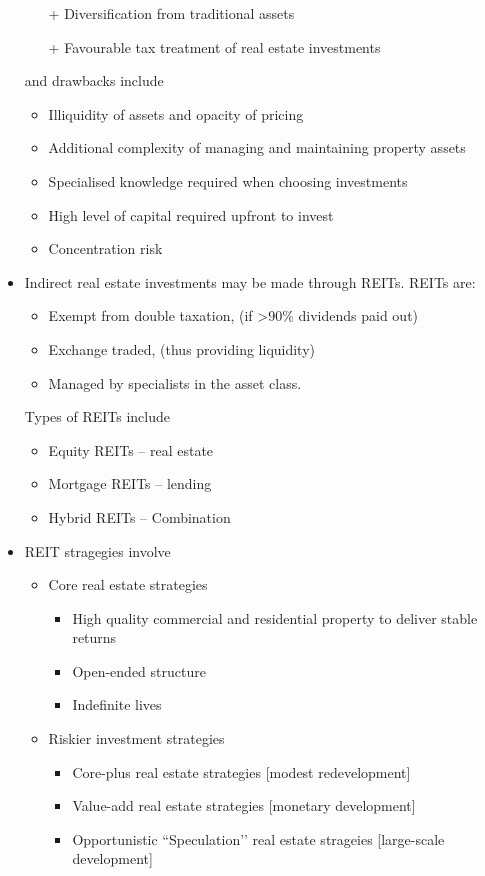 \documentclass[../notes_compiled.tex]{subfiles}
\begin{document}
\begin{itemize}
\begin{itemize}
\item[+] Diversification from traditional assets
\item[+] Favourable tax treatment of real estate investments
\end{itemize}
and drawbacks include
\begin{itemize}
\item Illiquidity of assets and opacity of pricing
\item Additional complexity of managing and maintaining property assets
\item Specialised knowledge required when choosing investments
\item High level of capital required upfront to invest
\item Concentration risk
\end{itemize}

\item Indirect real estate investments may be made through REITs. REITs are:
\begin{itemize}
\item Exempt from double taxation, (if >90\% dividends paid out)
\item Exchange traded, (thus providing liquidity)
\item Managed by specialists in the asset class.
\end{itemize}
Types of REITs include
\begin{itemize}
\item Equity REITs -- real estate
\item Mortgage REITs -- lending
\item Hybrid REITs -- Combination
\end{itemize}
\item REIT stragegies involve
\begin{itemize}
\item Core real estate strategies
\begin{itemize}
\item High quality commercial and residential property to deliver stable returns
\item Open-ended structure
\item Indefinite lives
\end{itemize}
\item Riskier investment strategies
\begin{itemize}
\item Core-plus real estate strategies [modest redevelopment]
\item Value-add real estate strategies [monetary development]
\item Opportunistic ``Speculation’’ real estate strageies [large-scale development]
\end{itemize}
\end{itemize}
\end{itemize}
\end{document}
